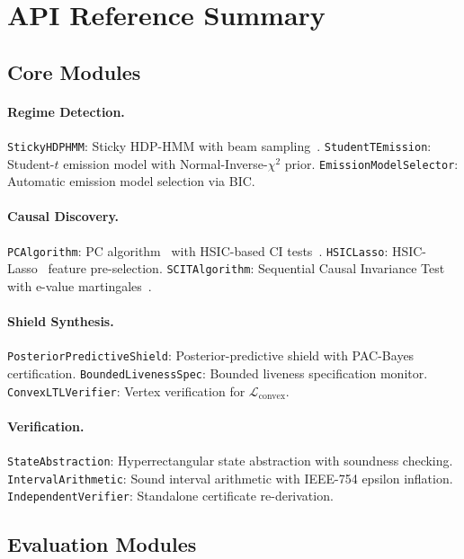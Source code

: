 \documentclass[11pt]{article}
\newcommand{\cL}{\mathcal{L}}
\begin{document}
\section{API Reference Summary}\label{app:api}

\subsection{Core Modules}

\paragraph{Regime Detection.}
\texttt{StickyHDPHMM}: Sticky HDP-HMM with beam
sampling~\cite{vangael2008beam}.
\texttt{StudentTEmission}: Student-$t$ emission model with
Normal-Inverse-$\chi^2$ prior.
\texttt{EmissionModelSelector}: Automatic emission model selection
via BIC.

\paragraph{Causal Discovery.}
\texttt{PCAlgorithm}: PC algorithm~\cite{spirtes2000causation} with
HSIC-based CI tests~\cite{zhang2012kernel}.
\texttt{HSICLasso}: HSIC-Lasso~\cite{yamada2014high} feature
pre-selection.
\texttt{SCITAlgorithm}: Sequential Causal Invariance Test with
e-value martingales~\cite{grunwald2024safe}.

\paragraph{Shield Synthesis.}
\texttt{PosteriorPredictiveShield}: Posterior-predictive shield with
PAC-Bayes certification.
\texttt{BoundedLivenessSpec}: Bounded liveness specification monitor.
\texttt{ConvexLTLVerifier}: Vertex verification for
$\cL_{\mathrm{convex}}$.

\paragraph{Verification.}
\texttt{StateAbstraction}: Hyperrectangular state abstraction with
soundness checking.
\texttt{IntervalArithmetic}: Sound interval arithmetic with
IEEE-754 epsilon inflation.
\texttt{IndependentVerifier}: Standalone certificate re-derivation.

\subsection{Evaluation Modules}
\end{document}
